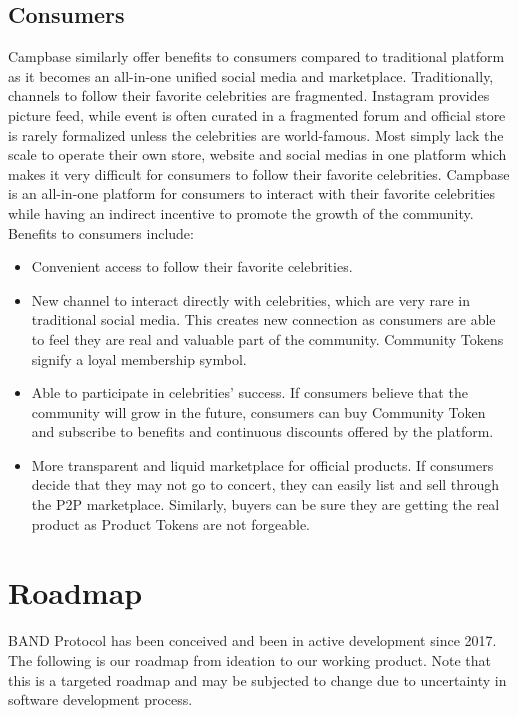 \documentclass[letterpaper,11pt]{article}
\begin{document}
\subsection{Consumers}
Campbase similarly offer benefits to consumers compared to traditional platform as it becomes an all-in-one unified social media and marketplace. Traditionally, channels to follow their favorite celebrities are fragmented. Instagram provides picture feed, while event is often curated in a fragmented forum and official store is rarely formalized unless the celebrities are world-famous. Most simply lack the scale to operate their own store, website and social medias in one platform which makes it very difficult for consumers to follow their favorite celebrities. Campbase is an all-in-one platform for consumers to interact with their favorite celebrities while having an indirect incentive to promote the growth of the community.
\newline
\newline
Benefits to consumers include:
\begin{itemize}
\item Convenient access to follow their favorite celebrities.
\item New channel to interact directly with celebrities, which are very rare in traditional social media. This creates new connection as consumers are able to feel they are real and valuable part of the community. Community Tokens signify a loyal membership symbol.
\item Able to participate in celebrities' success. If consumers believe that the community will grow in the future, consumers can buy Community Token and subscribe to benefits and continuous discounts offered by the platform.
\item More transparent and liquid marketplace for official products. If consumers decide that they may not go to concert, they can easily list and sell through the P2P marketplace. Similarly, buyers can be sure they are getting the real product as Product Tokens are not forgeable.
\end{itemize}

\newpage

\section{Roadmap}

BAND Protocol has been conceived and been in active development since 2017. The following is our roadmap from ideation to our working product. Note that this is a targeted roadmap and may be subjected to change due to uncertainty in software development process.
\end{document}
